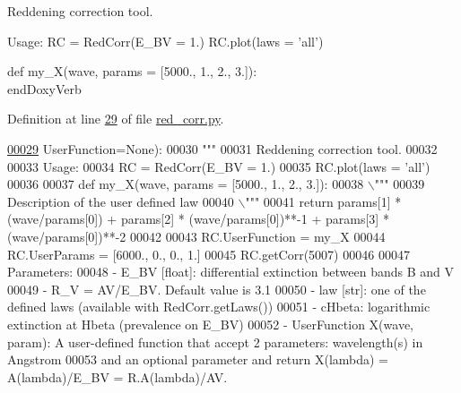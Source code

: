\begin{DoxyVerb}Reddening correction tool.

Usage:
    RC = RedCorr(E_BV = 1.)
    RC.plot(laws = 'all')

    def my_X(wave, params = [5000., 1., 2., 3.]):
\\end{DoxyVerb}
 

Definition at line \hyperlink{red__corr_8py_source_l00029}{29} of file \hyperlink{red__corr_8py_source}{red\+\_\+corr.\+py}.


\begin{DoxyCode}
\hypertarget{classpyneb_1_1extinction_1_1red__corr_1_1_red_corr_l00029}{}\hyperlink{classpyneb_1_1extinction_1_1red__corr_1_1_red_corr_a27b836e3bd87558f6156a8bf94fbf658}{00029}                  UserFunction=\textcolor{keywordtype}{None}):
00030         \textcolor{stringliteral}{"""}
00031 \textcolor{stringliteral}{        Reddening correction tool.}
00032 \textcolor{stringliteral}{}
00033 \textcolor{stringliteral}{        Usage:}
00034 \textcolor{stringliteral}{            RC = RedCorr(E\_BV = 1.)}
00035 \textcolor{stringliteral}{            RC.plot(laws = 'all')}
00036 \textcolor{stringliteral}{}
00037 \textcolor{stringliteral}{            def my\_X(wave, params = [5000., 1., 2., 3.]):}
00038 \textcolor{stringliteral}{                \(\backslash\)"""}
00039 \textcolor{stringliteral}{                Description of the user defined law}
00040 \textcolor{stringliteral}{                \(\backslash\)"""}
00041 \textcolor{stringliteral}{                return params[1] * (wave/params[0]) + params[2] * (wave/params[0])**-1 + params[3] *
       (wave/params[0])**-2}
00042 \textcolor{stringliteral}{}
00043 \textcolor{stringliteral}{            RC.UserFunction = my\_X}
00044 \textcolor{stringliteral}{            RC.UserParams = [6000., 0., 0., 1.]}
00045 \textcolor{stringliteral}{            RC.getCorr(5007)}
00046 \textcolor{stringliteral}{        }
00047 \textcolor{stringliteral}{        Parameters:}
00048 \textcolor{stringliteral}{            - E\_BV [float]: differential extinction between bands B and V}
00049 \textcolor{stringliteral}{            - R\_V = AV/E\_BV. Default value is 3.1}
00050 \textcolor{stringliteral}{            - law [str]: one of the defined laws (available with RedCorr.getLaws()) }
00051 \textcolor{stringliteral}{            - cHbeta: logarithmic extinction at Hbeta (prevalence on E\_BV)}
00052 \textcolor{stringliteral}{            - UserFunction X(wave, param): A user-defined function that accept 2 parameters: wavelength(s)
       in Angstrom }
00053 \textcolor{stringliteral}{            and an optional parameter and return X(lambda) = A(lambda)/E\_BV = R.A(lambda)/AV. }

\end{DoxyCode}
\end{DoxyVerb}

